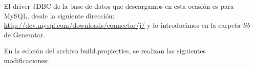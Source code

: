 El driver JDBC de la base de datos que descargamos en esta ocasión es para MySQL, desde la siguiente dirección: \url{http://dev.mysql.com/downloads/connector/j/} y lo introducimos en la carpeta {\em lib} de Generator.

En la edición del archivo build.propierties, se realizan las siguientes modificaciones:
